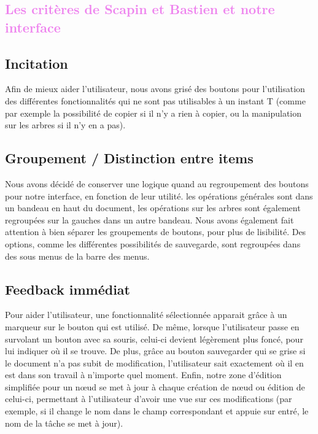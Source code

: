 \documentclass[12pt, a4paper]{article}
\begin{document}
\textcolor{Violet}{\section{Les critères de Scapin et Bastien et notre interface}}

\textcolor{NavyBlue}{\subsection{Incitation}}

Afin de mieux aider l'utilisateur, nous avons grisé des boutons pour l'utilisation des différentes fonctionnalités qui ne sont pas utilisables à un instant T (comme par exemple la possibilité de copier si il n'y a rien à copier, ou la manipulation sur les arbres si il n'y en a pas). 

\textcolor{NavyBlue}{\subsection{Groupement / Distinction entre items}}

Nous avons décidé de conserver une logique quand au regroupement des boutons pour notre interface, en fonction de leur utilité. les opérations générales sont dans un bandeau en haut du document, les opérations sur les arbres sont également regroupées sur la gauches dans un autre bandeau. Nous avons également fait attention à bien séparer les groupements de boutons, pour plus de lisibilité. Des options, comme les différentes possibilités de sauvegarde, sont regroupées dans des sous menus de la barre des menus.

\newpage
\textcolor{NavyBlue}{\subsection{Feedback immédiat}}

Pour aider l'utilisateur, une fonctionnalité sélectionnée apparait grâce à un marqueur sur le bouton qui est utilisé. De même, lorsque l'utilisateur passe en survolant un bouton avec sa souris, celui-ci devient légèrement plus foncé, pour lui indiquer où il se trouve. De plus, grâce au bouton sauvegarder qui se grise si le document n'a pas subit de modification, l'utilisateur sait exactement où il en est dans son travail à n'importe quel moment. Enfin, notre zone d'édition simplifiée pour un nœud se met à jour à chaque création de nœud ou édition de celui-ci, permettant à l'utilisateur d'avoir une vue sur ces modifications (par exemple, si il change le nom dans le champ correspondant et appuie sur entré, le nom de la tâche se met à jour).
\end{document}
